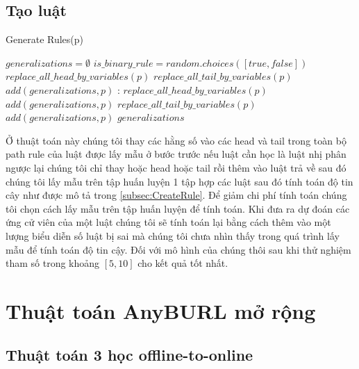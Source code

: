 \subsection{Tạo luật}
\label{subsec:CreateRule}

\begin{algorithm}
	\caption{Generate Rules(p)}
	\label{alg:GenerateRules}
	\begin{algorithmic}[1]
		\State $\textit{generalizations} = \emptyset$
		\State $is\_binary\_rule = random.choices([true,false])$
		\State $replace\_all\_head\_by\_variables(p)$
		\State $replace\_all\_tail\_by\_variables(p)$
		\State $add(generalizations, p)$
		\Else:
		\State $replace\_all\_head\_by\_variables(p)$
		\State $add(generalizations, p)$
		\State $replace\_all\_tail\_by\_variables(p)$
		\State $add(generalizations, p)$
		\EndIf
		\Return $generalizations$
		\EndProcedure
	\end{algorithmic}
\end{algorithm}

Ở thuật toán này chúng tôi thay các hằng số vào các head và tail trong toàn bộ path rule  của luật được lấy mẫu ở bước trước nếu luật cần học là luật nhị phân ngược lại chúng tôi chỉ thay hoặc head hoặc tail rồi thêm vào luật trả về sau đó chúng tôi lấy mẫu trên tập huấn luyện 1 tập hợp các luật sau đó tính toán độ tin cây như được mô tả trong \autoref{subsec:CreateRule}. Để giảm chi phí tính toán chúng tôi chọn cách lấy mẫu trên tập huấn luyện để tính toán. Khi đưa ra dự đoán các ứng cử viên của một luật chúng tôi sẽ tính toán lại bằng cách thêm vào một lượng biểu diễn số luật bị sai mà chúng tôi chưa nhìn thấy trong quá trình lấy mẫu để tính toán độ tin cậy. Đối với mô hình của chúng thôi sau khi thử nghiệm tham số trong khoảng \([5, 10]\) cho kết quả tốt nhất.


\section{Thuật toán AnyBURL mở rộng}
\subsection{Thuật toán 3 học offline-to-online}

